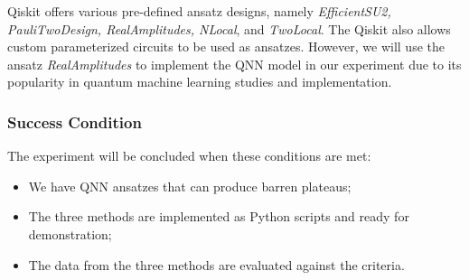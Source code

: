 Qiskit offers various pre-defined ansatz designs, namely \textit{EfficientSU2, PauliTwoDesign, RealAmplitudes, NLocal}, and \textit{TwoLocal}.
The Qiskit also allows custom parameterized circuits to be used as ansatzes.
However, we will use the ansatz  \textit{RealAmplitudes} to implement the QNN model in our experiment due to its popularity in quantum machine learning studies and implementation.


\subsubsection{Success Condition}
The experiment will be concluded when these conditions are met:
\begin{itemize}
    \item We have QNN ansatzes that can produce barren plateaus;
    \item The three methods are implemented as Python scripts and ready for demonstration;
    \item The data from the three methods are evaluated against the criteria.
\end{itemize}